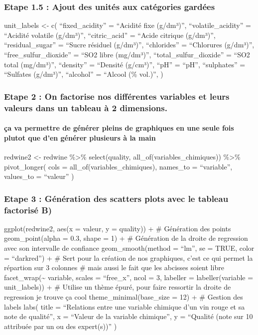 \documentclass[
]{article}
\begin{document}
\subsubsection{Etape 1.5 : Ajout des unités aux catégories
gardées}\label{etape-1.5-ajout-des-unituxe9s-aux-catuxe9gories-garduxe9es}

unit\_labels \textless- c( ``fixed\_acidity'' = ``Acidité fixe
(g/dm³)'', ``volatile\_acidity'' = ``Acidité volatile (g/dm³)'',
``citric\_acid'' = ``Acide citrique (g/dm³)'', ``residual\_sugar'' =
``Sucre résiduel (g/dm³)'', ``chlorides'' = ``Chlorures (g/dm³)'',
``free\_sulfur\_dioxide'' = ``SO2 libre (mg/dm³)'',
``total\_sulfur\_dioxide'' = ``SO2 total (mg/dm³)'', ``density'' =
``Densité (g/cm³)'', ``pH'' = ``pH'', ``sulphates'' = ``Sulfates
(g/dm³)'', ``alcohol'' = ``Alcool (\% vol.)'', )

\subsubsection{Etape 2 : On factorise nos différentes variables et leurs
valeurs dans un tableau à 2
dimensions.}\label{etape-2-on-factorise-nos-diffuxe9rentes-variables-et-leurs-valeurs-dans-un-tableau-uxe0-2-dimensions.}

\paragraph{ça va permettre de générer pleins de graphiques en une seule
fois plutot que d'en générer plusieurs à la
main}\label{uxe7a-va-permettre-de-guxe9nuxe9rer-pleins-de-graphiques-en-une-seule-fois-plutot-que-den-guxe9nuxe9rer-plusieurs-uxe0-la-main}

redwine2 \textless- redwine \%\textgreater\% select(quality,
all\_of(variables\_chimiques)) \%\textgreater\% pivot\_longer( cols =
all\_of(variables\_chimiques), names\_to = ``variable'', values\_to =
``valeur'' )

\subsubsection{Etape 3 : Génération des scatters plots avec le tableau
factorisé
B)}\label{etape-3-guxe9nuxe9ration-des-scatters-plots-avec-le-tableau-factorisuxe9-b}

ggplot(redwine2, aes(x = valeur, y = quality)) + \# Génération des
points geom\_point(alpha = 0.3, shape = 1) + \# Génération de la droite
de regression avec son intervalle de confiance geom\_smooth(method =
``lm'', se = TRUE, color = ``darkred'') + \# Sert pour la création de
nos graphiques, c'est ce qui permet la répartion sur 3 colonnes \# mais
aussi le fait que les abcisses soient libre
facet\_wrap(\textasciitilde{} variable, scales = ``free\_x'', ncol = 3,
labeller = labeller(variable = unit\_labels)) + \# Utilise un thème
épuré, pour faire ressortir la droite de regression je trouve ça cool
theme\_minimal(base\_size = 12) + \# Gestion des labels labs( title =
``Relations entre une variable chimique d'un vin rouge et sa note de
qualité'', x = ``Valeur de la variable chimique'', y = ``Qualité (note
sur 10 attribuée par un ou des expert(s))'' )
\end{document}
